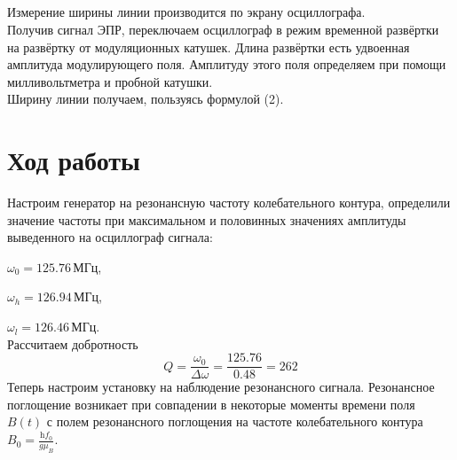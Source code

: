\documentclass[a4paper,12pt]{article}
\begin{document}
\subsection{}
Измерение ширины линии производится по экрану осциллографа.\\
Получив сигнал ЭПР, переключаем осциллограф в режим временной развёртки
на развёртку от модуляционных катушек. Длина развёртки есть удвоенная
амплитуда модулирующего поля. Амплитуду этого поля определяем при помощи
милливольтметра и пробной катушки.\\
Ширину линии получаем, пользуясь формулой (2).

\section{Ход работы}

Настроим генератор на резонансную частоту колебательного контура,
определили значение частоты при максимальном и половинных
значениях амплитуды выведенного на осциллограф сигнала:

$\omega_{0} = 125.76 \, \text{МГц}$,

$\omega_{h} = 126.94 \, \text{МГц}$,

$\omega_{l} = 126.46 \, \text{МГц}$.\\
Рассчитаем добротность
\begin{equation*}
    Q = \frac{\omega_0}{\Delta\omega} = \frac{125.76}{0.48} = 262
\end{equation*}
\newpage
Теперь настроим установку на наблюдение резонансного сигнала.
Резонансное поглощение возникает при совпадении в некоторые моменты времени поля $B(t)$ с полем резонансного поглощения на частоте колебательного контура $B_0=\frac{\mathrm{h}f_0}{g\mu_B}$.
\end{document}
